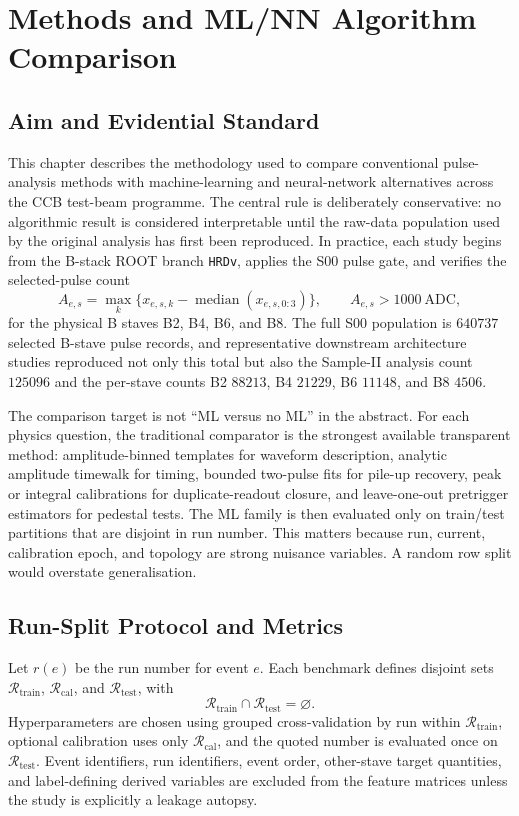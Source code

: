 \chapter{Methods and ML/NN Algorithm Comparison}

\section{Aim and Evidential Standard}

This chapter describes the methodology used to compare conventional pulse-analysis methods with machine-learning and neural-network alternatives across the CCB test-beam programme. The central rule is deliberately conservative: no algorithmic result is considered interpretable until the raw-data population used by the original analysis has first been reproduced. In practice, each study begins from the B-stack ROOT branch \texttt{HRDv}, applies the S00 pulse gate, and verifies the selected-pulse count
\[
  A_{e,s}=\max_{k}\{x_{e,s,k}-\operatorname{median}(x_{e,s,0:3})\},
  \qquad A_{e,s}>1000~\mathrm{ADC},
\]
for the physical B staves B2, B4, B6, and B8. The full S00 population is \(640737\) selected B-stave pulse records, and representative downstream architecture studies reproduced not only this total but also the Sample-II analysis count \(125096\) and the per-stave counts B2 \(88213\), B4 \(21229\), B6 \(11148\), and B8 \(4506\).

The comparison target is not ``ML versus no ML'' in the abstract. For each physics question, the traditional comparator is the strongest available transparent method: amplitude-binned templates for waveform description, analytic amplitude timewalk for timing, bounded two-pulse fits for pile-up recovery, peak or integral calibrations for duplicate-readout closure, and leave-one-out pretrigger estimators for pedestal tests. The ML family is then evaluated only on train/test partitions that are disjoint in run number. This matters because run, current, calibration epoch, and topology are strong nuisance variables. A random row split would overstate generalisation.

\section{Run-Split Protocol and Metrics}

Let \(r(e)\) be the run number for event \(e\). Each benchmark defines disjoint sets \(\mathcal{R}_{\mathrm{train}}\), \(\mathcal{R}_{\mathrm{cal}}\), and \(\mathcal{R}_{\mathrm{test}}\), with
\[
  \mathcal{R}_{\mathrm{train}}\cap \mathcal{R}_{\mathrm{test}}=\varnothing .
\]
Hyperparameters are chosen using grouped cross-validation by run within \(\mathcal{R}_{\mathrm{train}}\), optional calibration uses only \(\mathcal{R}_{\mathrm{cal}}\), and the quoted number is evaluated once on \(\mathcal{R}_{\mathrm{test}}\). Event identifiers, run identifiers, event order, other-stave target quantities, and label-defining derived variables are excluded from the feature matrices unless the study is explicitly a leakage autopsy.

